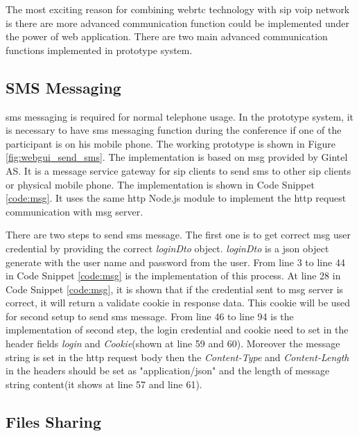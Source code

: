 \noindent The most exciting reason for combining \gls{webrtc} technology with \gls{sip} \gls{voip} network is there are more advanced communication function could be implemented under the power of web application. There are two main advanced communication functions implemented in prototype system.

\subsection{SMS Messaging}

\par \gls{sms} messaging is required for normal telephone usage. In the prototype system, it is necessary to have \gls{sms} messaging function during the conference if one of the participant is on his mobile phone. The working prototype is shown in Figure \ref{fig:webgui_send_sms}. The implementation is based on \gls{msg} provided by Gintel AS. It is a message service gateway for \gls{sip} clients to send \gls{sms} to other \gls{sip} clients or physical mobile phone. The implementation is shown in Code Snippet \ref{code:msg}. It uses the same \gls{http} Node.js module to implement the \gls{http} request communication with \gls{msg} server.

\par There are two steps to send \gls{sms} message. The first one is to get correct \gls{msg} user credential by providing the correct \textit{loginDto} object. \textit{loginDto} is a \gls{json} object generate with the user name and password from the user. From line 3 to line 44 in Code Snippet \ref{code:msg} is the implementation of this process. At line 28 in Code Snippet \ref{code:msg}, it is shown that if the credential sent to \gls{msg} server is correct, it will return a validate cookie in response data. This cookie will be used for second setup to send \gls{sms} message. From line 46 to line 94 is the implementation of second step, the login credential and cookie need to set in the header fields \textit{login} and \textit{Cookie}(shown at line 59 and 60). Moreover the message string is set in the \gls{http} request body then the \textit{Content-Type} and \textit{Content-Length} in the headers should be set as "application/json" and the length of message string content(it shows at line 57 and line 61).

\subsection{Files Sharing}


